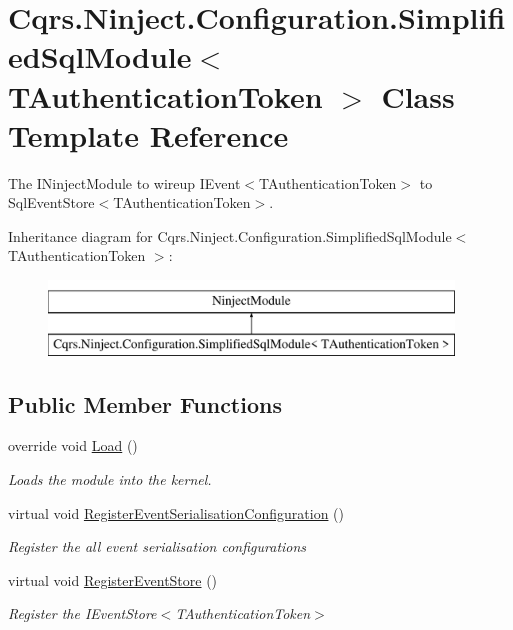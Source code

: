 \hypertarget{classCqrs_1_1Ninject_1_1Configuration_1_1SimplifiedSqlModule}{}\section{Cqrs.\+Ninject.\+Configuration.\+Simplified\+Sql\+Module$<$ T\+Authentication\+Token $>$ Class Template Reference}
\label{classCqrs_1_1Ninject_1_1Configuration_1_1SimplifiedSqlModule}


The I\+Ninject\+Module to wireup I\+Event$<$\+T\+Authentication\+Token$>$ to Sql\+Event\+Store$<$\+T\+Authentication\+Token$>$.  


Inheritance diagram for Cqrs.\+Ninject.\+Configuration.\+Simplified\+Sql\+Module$<$ T\+Authentication\+Token $>$\+:\begin{figure}[H]
\begin{center}
\leavevmode
\includegraphics[height=2.000000cm]{classCqrs_1_1Ninject_1_1Configuration_1_1SimplifiedSqlModule}
\end{center}
\end{figure}
\subsection*{Public Member Functions}
\begin{DoxyCompactItemize}
\item 
override void \hyperlink{classCqrs_1_1Ninject_1_1Configuration_1_1SimplifiedSqlModule_ab7d1313e9ab87ad752759e6acfcd2eb5_ab7d1313e9ab87ad752759e6acfcd2eb5}{Load} ()
\begin{DoxyCompactList}\small\item\em Loads the module into the kernel. \end{DoxyCompactList}\item 
virtual void \hyperlink{classCqrs_1_1Ninject_1_1Configuration_1_1SimplifiedSqlModule_ad4c66a055e431eb9502112291ea602e2_ad4c66a055e431eb9502112291ea602e2}{Register\+Event\+Serialisation\+Configuration} ()
\begin{DoxyCompactList}\small\item\em Register the all event serialisation configurations \end{DoxyCompactList}\item 
virtual void \hyperlink{classCqrs_1_1Ninject_1_1Configuration_1_1SimplifiedSqlModule_a56dec199f21a562dd6e0c4e2961a1858_a56dec199f21a562dd6e0c4e2961a1858}{Register\+Event\+Store} ()
\begin{DoxyCompactList}\small\item\em Register the I\+Event\+Store$<$\+T\+Authentication\+Token$>$ \end{DoxyCompactList}\end{DoxyCompactItemize}


